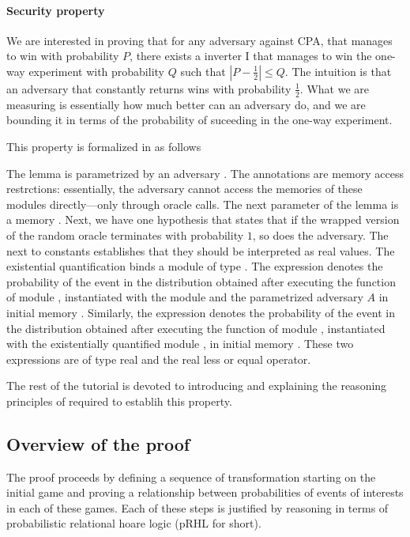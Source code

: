 \paragraph{Security property}
We are interested in proving that for any adversary  against CPA,
that manages to win with probability $P$, there exists a inverter
I that manages to win the one-way experiment with probability $Q$ such
that $| P - \frac{1}{2} |\leq Q$. The intuition is that an adversary
that constantly returns  wins with probability
$\frac{1}{2}$. What we are measuring is essentially how much better
can an adversary do, and we are bounding it in terms of the
probability of suceeding in the one-way experiment.

This property is formalized in \EasyCrypt as follows


The lemma  is parametrized by an adversary . The
annotations  are memory access restrctions:
essentially, the adversary cannot access the memories of these modules
directly---only through oracle calls. The next parameter of the lemma
is a memory . Next, we have one hypothesis that states that if
the wrapped version of the random oracle terminates with probability
$1$, so does the adversary. The  next to constants establishes
that they should be interpreted as real values. The existential
quantification binds a module  of type . The
expression  denotes the
probability of the event  in the distribution obtained after
executing the  function of module , instantiated with
the module  and the parametrized adversary $A$ in initial
memory . Similarly, the expression  denotes the probability of the event  in the
distribution obtained after executing the  function of module
, instantiated with the existentially quantified module ,
in initial memory . These two expressions are of type real and
the \ec{<=} real less or equal operator.

The rest of the tutorial is devoted to introducing and explaining the
reasoning principles of \EasyCrypt required to establih this property.

\subsection{Overview of the proof}
The proof proceeds by defining a sequence of transformation starting
on the initial game and proving a relationship between probabilities
of events of interests in each of these games. Each of these steps is
justified by reasoning in terms of probabilistic relational hoare
logic (pRHL for short).

